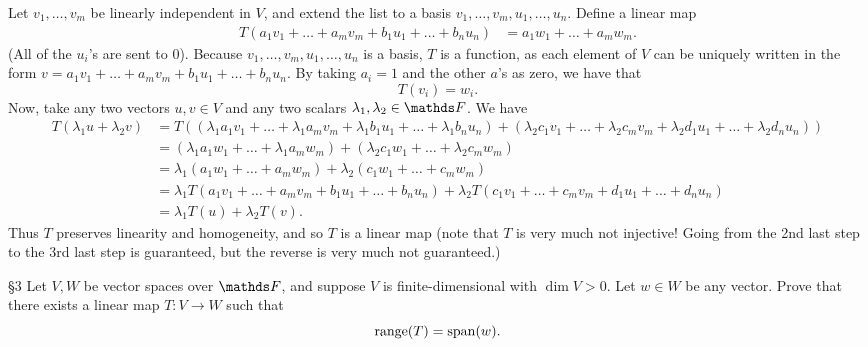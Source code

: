 \documentclass{homework}
\begin{document}
\begin{solution}
  Let $v_1,\ldots,v_m$ be linearly independent in $V$, and extend the list to a basis
  $v_1,\ldots,v_m,u_1,\ldots,u_n$. Define a linear map \begin{align*}
    T(a_1v_1+\ldots+a_mv_m+b_1u_1+\ldots+b_nu_n) &= a_1w_1+\ldots+a_mw_m
  .\end{align*}
  (All of the $u_i$'s are sent to $0$). Because $v_1,\ldots,v_m,u_1,\ldots,u_n$ is a basis, $T$ is a
  function, as each element of $V$ can be uniquely written in the form
  $v=a_1v_1+\ldots+a_mv_m+b_1u_1+\ldots+b_nu_n$. By taking $a_i=1$ and the other $a$'s as zero, we
  have that \[
    T(v_i)=w_i
  .\] Now, take any two vectors $u,v\in V$ and any two scalars $\lambda_1,\lambda_2\in \F$. We have
  \begin{align*}
    T(\lambda_1u+\lambda_2v)&=
    T((\lambda_1a_1v_1+\ldots+\lambda_1a_mv_m+\lambda_1b_1u_1+\ldots+\lambda_1b_nu_n)+(\lambda_2c_1v_1+\ldots+\lambda_2c_mv_m+\lambda_2d_1u_1+\ldots+\lambda_2d_nu_n))\\
          &=(\lambda_1a_1w_1+\ldots+\lambda_1a_mw_m) +(\lambda_2c_1w_1+\ldots+\lambda_2c_mw_m)\\
          &=\lambda_1(a_1w_1+\ldots+a_mw_m) +\lambda_2(c_1w_1+\ldots+c_mw_m)\\
          &= \lambda_1T(a_1v_1+\ldots+a_mv_m+b_1u_1+\ldots+b_nu_n)
          +\lambda_2T(c_1v_1+\ldots+c_mv_m+d_1u_1+\ldots+d_nu_n)\\
          &= \lambda_1T(u) + \lambda_2T(v)
        .\end{align*} Thus $T$ preserves linearity and homogeneity, and so $T$ is a linear map (note
        that $T$ is very much not injective! Going from the 2nd last step to the 3rd last step is
        guaranteed, but the reverse is very much not guaranteed.)
\end{solution}

\begin{problem}{\S 3}
  Let $V,W$ be vector spaces over $\F$, and suppose $V$ is finite-dimensional with $\dim V >0$. Let
  $w\in W$ be any vector. Prove that there exists a linear map $T:V\to W$ such that \[
    \operatorname{range}(T)=\operatorname{span}(w)
  .\] 
\end{problem}
\end{document}
